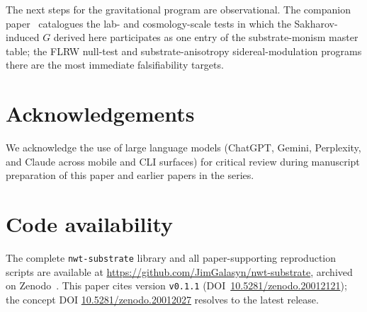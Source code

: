 \documentclass[11pt]{article}
\begin{document}
The next steps for the gravitational program are observational.
The companion paper~\cite{paper19} catalogues the lab- and
cosmology-scale tests in which the Sakharov-induced $G$ derived
here participates as one entry of the substrate-monism master
table; the FLRW null-test and substrate-anisotropy
sidereal-modulation programs there are the most immediate
falsifiability targets.

\section*{Acknowledgements}

We acknowledge the use of large language models (ChatGPT, Gemini,
Perplexity, and Claude across mobile and CLI surfaces) for
critical review during manuscript preparation of this paper and
earlier papers in the series.

\section*{Code availability}

The complete \texttt{nwt-substrate} library and all paper-supporting
reproduction scripts are available at
\url{https://github.com/JimGalasyn/nwt-substrate}, archived on
Zenodo~\cite{nwt_substrate_repo}.  This paper cites version
\texttt{v0.1.1}
(DOI~\href{https://doi.org/10.5281/zenodo.20012121}{10.5281/zenodo.20012121});
the concept DOI \href{https://doi.org/10.5281/zenodo.20012027}{10.5281/zenodo.20012027}
resolves to the latest release.
\end{document}
